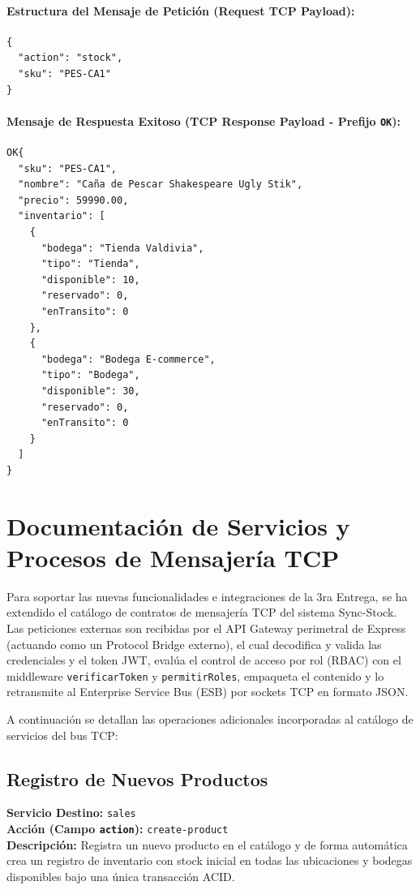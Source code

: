 \documentclass[12pt,a4paper]{article}
\begin{document}
\paragraph{Estructura del Mensaje de Petición (Request TCP Payload):}
\begin{verbatim}
{
  "action": "stock",
  "sku": "PES-CA1"
}
\end{verbatim}

\paragraph{Mensaje de Respuesta Exitoso (TCP Response Payload - Prefijo \texttt{OK}):}
\begin{verbatim}
OK{
  "sku": "PES-CA1",
  "nombre": "Caña de Pescar Shakespeare Ugly Stik",
  "precio": 59990.00,
  "inventario": [
    {
      "bodega": "Tienda Valdivia",
      "tipo": "Tienda",
      "disponible": 10,
      "reservado": 0,
      "enTransito": 0
    },
    {
      "bodega": "Bodega E-commerce",
      "tipo": "Bodega",
      "disponible": 30,
      "reservado": 0,
      "enTransito": 0
    }
  ]
}
\end{verbatim}


\section{Documentación de Servicios y Procesos de Mensajería TCP}

Para soportar las nuevas funcionalidades e integraciones de la 3ra Entrega, se ha extendido el catálogo de contratos de mensajería TCP del sistema Sync-Stock. Las peticiones externas son recibidas por el API Gateway perimetral de Express (actuando como un Protocol Bridge externo), el cual decodifica y valida las credenciales y el token JWT, evalúa el control de acceso por rol (RBAC) con el middleware \texttt{verificarToken} y \texttt{permitirRoles}, empaqueta el contenido y lo retransmite al Enterprise Service Bus (ESB) por sockets TCP en formato JSON.

A continuación se detallan las operaciones adicionales incorporadas al catálogo de servicios del bus TCP:

\subsection{Registro de Nuevos Productos}
\textbf{Servicio Destino:} \texttt{sales} \\
\textbf{Acción (Campo \texttt{action}):} \texttt{create-product} \\
\textbf{Descripción:} Registra un nuevo producto en el catálogo y de forma automática crea un registro de inventario con stock inicial en todas las ubicaciones y bodegas disponibles bajo una única transacción ACID.
\end{document}
